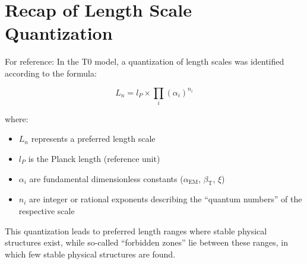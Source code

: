 \documentclass[12pt,a4paper]{article}
\newcommand{\alphaEM}{\alpha_{\text{EM}}}
\newcommand{\betaT}{\beta_{\text{T}}}
\begin{document}
	\section{Recap of Length Scale Quantization}
	
	For reference: In the T0 model, a quantization of length scales was identified according to the formula:
	
	\begin{equation}
		L_n = l_P \times \prod_{i} (\alpha_i)^{n_i}
	\end{equation}
	
	where:
	\begin{itemize}
		\item $L_n$ represents a preferred length scale
		\item $l_P$ is the Planck length (reference unit)
		\item $\alpha_i$ are fundamental dimensionless constants ($\alphaEM$, $\betaT$, $\xi$)
		\item $n_i$ are integer or rational exponents describing the ``quantum numbers'' of the respective scale
	\end{itemize}
	
	This quantization leads to preferred length ranges where stable physical structures exist, while so-called ``forbidden zones'' lie between these ranges, in which few stable physical structures are found.
	
\end{document}
